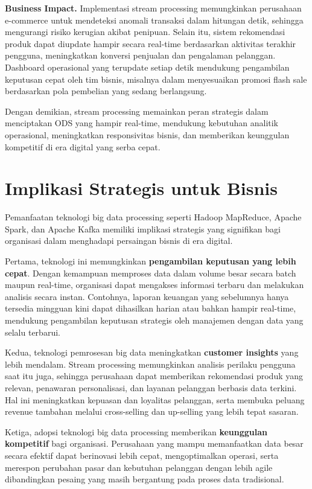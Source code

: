 \textbf{Business Impact.} Implementasi stream processing memungkinkan perusahaan e-commerce untuk mendeteksi anomali transaksi dalam hitungan detik, sehingga mengurangi risiko kerugian akibat penipuan. Selain itu, sistem rekomendasi produk dapat diupdate hampir secara real-time berdasarkan aktivitas terakhir pengguna, meningkatkan konversi penjualan dan pengalaman pelanggan. Dashboard operasional yang terupdate setiap detik mendukung pengambilan keputusan cepat oleh tim bisnis, misalnya dalam menyesuaikan promosi flash sale berdasarkan pola pembelian yang sedang berlangsung.

Dengan demikian, stream processing memainkan peran strategis dalam menciptakan ODS yang hampir real-time, mendukung kebutuhan analitik operasional, meningkatkan responsivitas bisnis, dan memberikan keunggulan kompetitif di era digital yang serba cepat.


\section{Implikasi Strategis untuk Bisnis}

Pemanfaatan teknologi big data processing seperti Hadoop MapReduce, Apache Spark, dan Apache Kafka memiliki implikasi strategis yang signifikan bagi organisasi dalam menghadapi persaingan bisnis di era digital.

Pertama, teknologi ini memungkinkan \textbf{pengambilan keputusan yang lebih cepat}. Dengan kemampuan memproses data dalam volume besar secara batch maupun real-time, organisasi dapat mengakses informasi terbaru dan melakukan analisis secara instan. Contohnya, laporan keuangan yang sebelumnya hanya tersedia mingguan kini dapat dihasilkan harian atau bahkan hampir real-time, mendukung pengambilan keputusan strategis oleh manajemen dengan data yang selalu terbarui.

Kedua, teknologi pemrosesan big data meningkatkan \textbf{customer insights} yang lebih mendalam. Stream processing memungkinkan analisis perilaku pengguna saat itu juga, sehingga perusahaan dapat memberikan rekomendasi produk yang relevan, penawaran personalisasi, dan layanan pelanggan berbasis data terkini. Hal ini meningkatkan kepuasan dan loyalitas pelanggan, serta membuka peluang revenue tambahan melalui cross-selling dan up-selling yang lebih tepat sasaran.

Ketiga, adopsi teknologi big data processing memberikan \textbf{keunggulan kompetitif} bagi organisasi. Perusahaan yang mampu memanfaatkan data besar secara efektif dapat berinovasi lebih cepat, mengoptimalkan operasi, serta merespon perubahan pasar dan kebutuhan pelanggan dengan lebih agile dibandingkan pesaing yang masih bergantung pada proses data tradisional.

